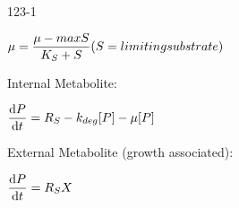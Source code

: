 \begin{mitframe}{123-1}
\begin{listone}
	\item $\chempot=\dfrac{\chempot-{max}\entropy}{\dilfac_{\entropy}+\entropy}(\entropy = limiting substrate)$
\item Internal Metabolite:
\item $\dfrac{\mathrm{d}\p}{\mathrm{d}\timet}=\gasconst_{\entropy}-\thermcond_{deg}[\p]-\chempot[\p]$
\item External Metabolite (growth associated):
\item $\dfrac{\mathrm{d}\p}{\mathrm{d}\timet}=\gasconst_{\entropy}X$
\end{listone}    
\end{mitframe}